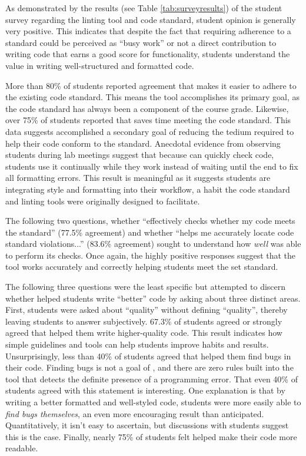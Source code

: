 \documentclass[sigconf]{acmart}
\begin{document}
As demonstrated by the results (see Table \ref{tab:surveyresults}) of the student survey regarding the linting tool and code
standard, student opinion is generally very positive. This indicates that despite
the fact that requiring adherence to a standard could be perceived as ``busy work'' or not
a direct contribution to writing code that earns a good score for
functionality, students understand the value in writing well-structured and formatted
code.

More than 80\% of students reported agreement that \tool{} makes
it easier to adhere to the existing code standard. This means the tool accomplishes
its primary goal, as the code standard has always been a component of the course grade.
Likewise, over 75\% of students reported that  \tool{} saves time meeting the code
standard. This data suggests \tool{} accomplished a secondary goal of reducing
the tedium required to help their code conform to the standard. Anecdotal evidence from
observing students during lab meetings suggest that because \tool{} can quickly
check code, students use it continually while they work instead of waiting until the end
to fix all formatting errors. This result is meaningful as it suggests students are
integrating style and formatting into their workflow, a habit the code
standard and linting tools were originally designed to facilitate.

The following two questions, whether \tool{} ``effectively checks whether my code meets the
standard'' (77.5\% agreement) and whether \tool{} ``helps me accurately locate code
standard violations...'' (83.6\% agreement) sought to understand how \textit{well}
\tool{} was able to perform its checks. Once again, the highly positive responses
suggest that the tool works accurately and correctly helping students meet the set
standard.

The following three questions were the least specific but attempted to discern whether
\tool{} helped students write ``better'' code by asking about
three distinct areas. First, students were asked about ``quality'' without defining
``quality'', thereby leaving students to answer subjectively. 67.3\% of students agreed
or strongly agreed that \tool{} helped them write higher-quality code. This result  indicates how simple guidelines and tools can help students improve habits and results. Unsurprisingly, less than 40\% of students
agreed that \tool{} helped them find bugs in their code. Finding bugs is not a
goal of \tool{}, and there are zero rules built into the tool
that detects the definite presence of a programming error. That even 40\% of students
agreed with this statement is interesting. One explanation is that by writing
a better formatted and well-styled code, students were more easily able to \textit{find
  bugs themselves}, an even more encouraging result than anticipated. Quantitatively, it  isn't easy to ascertain, but discussions with students
suggest this is the case. Finally, nearly 75\% of students felt \tool{}
helped make their code more readable.
\end{document}

